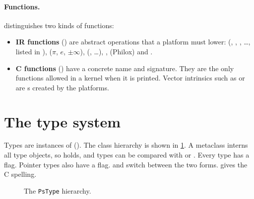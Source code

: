 \paragraph{Functions.}
 distinguishes two kinds of functions:
\begin{itemize}
  \item \textbf{IR functions} () are abstract operations that a
        platform must lower:  (, ,
        , \dots, listed in ), 
        ($\pi$, $e$, $\pm\infty$), 
        (, \dots), , 
        (Philox) and .
  \item \textbf{C functions} () have a concrete name and signature. They
        are the only functions allowed in a kernel when it is printed. Vector
        intrinsics such as  or  are
        s created by the platforms.
\end{itemize}

\section{The type system}\label{r01:sec:types}

Types are instances of  (). The class hierarchy
is shown in \cref{r01:fig:types}. A metaclass interns all type objects, so
 holds, and types can be compared with 
or \code{==}. Every type has a  flag. Pointer types also have a
 flag.  and  switch between the two
forms.  gives the C spelling.

\begin{figure}[htbp]
  \centering
  
  \caption[The \texttt{PsType} hierarchy]{The \texttt{PsType} hierarchy.}
  \label{r01:fig:types}
\end{figure}


